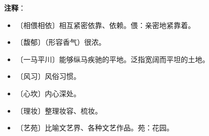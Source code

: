 \documentclass[12pt,UTF-8,openany]{ctexbook}
\begin{document}
\newpage

\textbf{注释}：

\vspace{-1em}

\begin{itemize}
    \setlength\itemsep{-0.2em}
    \item 〔相偎相依〕相互紧密依靠、依赖。偎：亲密地紧靠着。
    \item 〔馥郁〕（形容香气）很浓。
    \item 〔一马平川〕能够纵马疾驰的平地。泛指宽阔而平坦的土地。
    \item 〔风习〕风俗习惯。
    \item 〔心坎〕内心深处。
    \item 〔理妆〕整理妆容、梳妆。
    \item 〔艺苑〕比喻文艺界、各种文艺作品。苑：花园。
\end{itemize}
\end{document}
